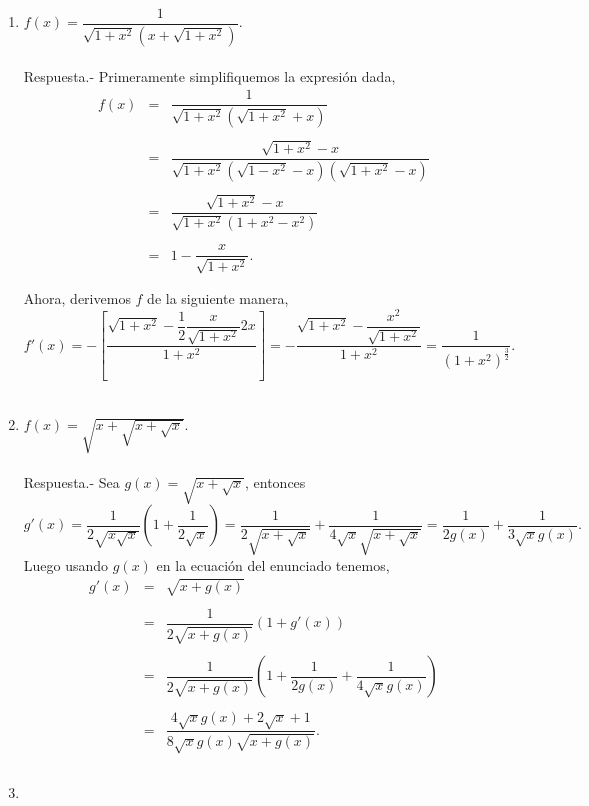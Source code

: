 \begin{enumerate}[\bfseries 1.]
    \item $f(x)=\dfrac{1}{\sqrt{1+x^2}\left(x+\sqrt{1+x^2}\right)}$.\\\\
	Respuesta.- \; Primeramente simplifiquemos la expresión dada,
	$$\begin{array}{rcl}
	    f(x)&=&\dfrac{1}{\sqrt{1+x^2}\left(\sqrt{1+x^2}+x\right)}\\\\
		&=&\dfrac{\sqrt{1+x^2}-x}{\sqrt{1+x^2}\left(\sqrt{1-x^2}-x\right)\left(\sqrt{1+x^2}-x\right)}\\\\
		&=&\dfrac{\sqrt{1+x^2}-x}{\sqrt{1+x^2}\left(1+x^2-x^2\right)}\\\\
		&=&1-\dfrac{x}{\sqrt{1+x^2}}.\\\\
	\end{array}$$
	Ahora, derivemos $f$ de la siguiente manera,
	$$f'(x)=-\left[\dfrac{\sqrt{1+x^2}-\dfrac{1}{2}\dfrac{x}{\sqrt{1+x^2}}2x}{1+x^2}\right]=-\dfrac{\sqrt{1+x^2}-\dfrac{x^2}{\sqrt{1+x^2}}}{1+x^2}=\dfrac{1}{\left(1+x^2\right)^{\frac{3}{2}}}.$$\\

    \item $f(x)=\sqrt{x+\sqrt{x+\sqrt{x}}}$.\\\\
	Respuesta.-\; Sea $g(x)=\sqrt{x+\sqrt{x}}$, entonces
	$$g'(x)=\dfrac{1}{2\sqrt{x\sqrt{x}}}\left(1+\dfrac{1}{2\sqrt{x}}\right)=\dfrac{1}{2\sqrt{x+\sqrt{x}}}+\dfrac{1}{4\sqrt{x}\sqrt{x+\sqrt{x}}}=\dfrac{1}{2g(x)}+\dfrac{1}{3\sqrt{x}g(x)}.$$
	Luego usando $g(x)$ en la ecuación del enunciado tenemos,
	$$\begin{array}{rcl}
	    g'(x)&=&\sqrt{x+g(x)}\\\\
		 &=&\dfrac{1}{2\sqrt{x+g(x)}}\left(1+g'(x)\right)\\\\
		 &=&\dfrac{1}{2\sqrt{x+g(x)}}\left(1+\dfrac{1}{2g(x)}+\dfrac{1}{4\sqrt{x}g(x)}\right)\\\\
		 &=&\dfrac{4\sqrt{x}g(x)+2\sqrt{x}+1}{8\sqrt{x}g(x)\sqrt{x+g(x)}}.\\\\
	\end{array}$$
	\vspace{.7cm}

    \item 

\end{enumerate}
